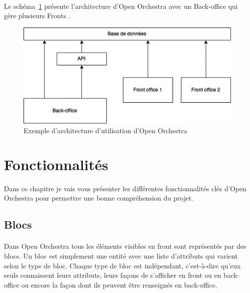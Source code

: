 	    \paragraph{}	
		Le schéma~\ref{architecture} présente l'architecture d'Open Orchestra avec un \og Back-office \fg{} qui gère plusieurs \og Fronts \fg{}.
		\begin{figure}[H]
        \begin{center}
          \includegraphics[scale=0.75]{images/architecture_open_orchestra}
        \end{center}
        \caption{Exemple d'architecture d'utilisation d'Open Orchestra}
        \label{architecture}
      \end{figure}

   
\section{Fonctionnalités}
	    \paragraph{}
	    Dans ce chapitre je vais vous présenter les différentes fonctionnalités clés d'Open Orchestra pour permettre une bonne compréhension du projet.
	      \subsection{Blocs}
	        \label{Blocs}  
	       \paragraph{}
	      Dans Open Orchestra tous les éléments visibles en front sont représentés par des blocs. Un bloc est simplement une entité avec une liste d'attributs qui varient selon le type de bloc. Chaque type de bloc est indépendant, c'est-à-dire qu'eux seuls connaissent leurs attributs, leurs façons de s'afficher en front ou en back-office ou encore la façon dont ils peuvent être renseignés en back-office. 
